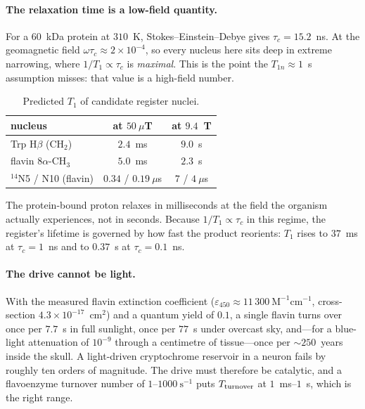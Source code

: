 \documentclass[aps,prx,reprint,superscriptaddress,nofootinbib,floatfix]{revtex4-2}
\begin{document}
\paragraph*{The relaxation time is a low-field quantity.}
For a $60$~kDa protein at $310$~K, Stokes--Einstein--Debye gives
$\tau_c=15.2$~ns. At the geomagnetic field $\omega\tau_c\approx2\times10^{-4}$, so
every nucleus here sits deep in extreme narrowing, where $1/T_1\propto\tau_c$ is
\emph{maximal}. This is the point the $T_{1n}\approx1$~s assumption misses: that
value is a high-field number.

\begin{table}[H]
\caption{\label{tab:predT1}Predicted $T_1$ of candidate register nuclei.}
\begin{ruledtabular}
\begin{tabular}{lcc}
nucleus & at $50~\mu$T & at $9.4$~T \\
\hline
Trp H$\beta$ (CH$_2$) & $2.4$~ms & $9.0$~s \\
flavin $8\alpha$-CH$_3$ & $5.0$~ms & $2.3$~s \\
$^{14}$N5 / N10 (flavin) & $0.34$ / $0.19~\mu$s & $7$ / $4~\mu$s \\
\end{tabular}
\end{ruledtabular}
\end{table}

The protein-bound proton relaxes in milliseconds at the field the organism
actually experiences, not in seconds. Because $1/T_1\propto\tau_c$ in this
regime, the register's lifetime is governed by how fast the product reorients:
$T_1$ rises to $37$~ms at $\tau_c=1$~ns and to $0.37$~s at $\tau_c=0.1$~ns.

\paragraph*{The drive cannot be light.}
With the measured flavin extinction coefficient ($\varepsilon_{450}\approx
11\,300~\mathrm{M^{-1}cm^{-1}}$, cross-section $4.3\times10^{-17}$~cm$^2$) and a
quantum yield of $0.1$, a single flavin turns over once per $7.7$~s in full
sunlight, once per $77$~s under overcast sky, and---for a blue-light attenuation
of $10^{-9}$ through a centimetre of tissue---once per $\sim\!250$~years inside
the skull. A light-driven cryptochrome reservoir in a neuron fails by roughly ten
orders of magnitude. The drive must therefore be catalytic, and a flavoenzyme
turnover number of $1$--$1000~\mathrm{s^{-1}}$ puts $T_{\rm turnover}$ at
$1$~ms--$1$~s, which is the right range.
\end{document}
